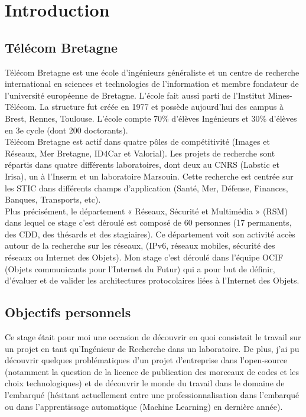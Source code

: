 \documentclass{article}
\begin{document}
\thispagestyle{empty}
\tableofcontents
\listoffigures
\newpage
\setcounter{page}{1}

\section{Introduction}
\subsection{Télécom Bretagne}
Télécom Bretagne est une école d'ingénieurs généraliste et un centre de recherche international en sciences et technologies de l'information et membre fondateur de l'université européenne de Bretagne. L'école fait aussi parti de l'Institut Mines-Télécom. La structure fut créée en 1977 et possède aujourd'hui des campus à Brest, Rennes, Toulouse. L'école compte 70\% d'élèves Ingénieurs et 30\% d'élèves en 3e cycle (dont 200 doctorants).\\
Télécom Bretagne est actif dans quatre pôles de compétitivité (Images et Réseaux, Mer Bretagne, ID4Car et Valorial). Les projets de recherche sont répartis dans quatre différents laboratoires, dont deux au CNRS (Labstic et Irisa), un à l'Inserm et un laboratoire Marsouin. Cette recherche est centrée sur les STIC dans différents champs d'application (Santé, Mer, Défense, Finances, Banques, Transports, etc).\\
Plus précisément, le département « Réseaux, Sécurité et Multimédia » (RSM) dans lequel ce stage c'est déroulé est composé de 60 personnes (17 permanents, des CDD, des thésards et des stagiaires). Ce département voit son activité accès autour de la recherche sur les réseaux, (IPv6, réseaux mobiles, sécurité des réseaux ou Internet des Objets). Mon stage c'est déroulé dans l'équipe OCIF (Objets communicants pour l'Internet du Futur) qui a pour but de définir, d’évaluer et de valider les architectures protocolaires liées à l’Internet des Objets.
\subsection{Objectifs personnels}
Ce stage était pour moi une occasion de découvrir en quoi consistait le travail sur un projet en tant qu'Ingénieur de Recherche dans un laboratoire. De plus, j'ai pu découvrir quelques problématiques d'un projet d'entreprise dans l'open-source (notamment la question de la licence de publication des morceaux de codes et les choix technologiques) et de découvrir le monde du travail dans le domaine de l'embarqué (hésitant actuellement entre une professionnalisation dans l'embarqué ou dans l'apprentissage automatique (Machine Learning) en dernière année).
\end{document}
